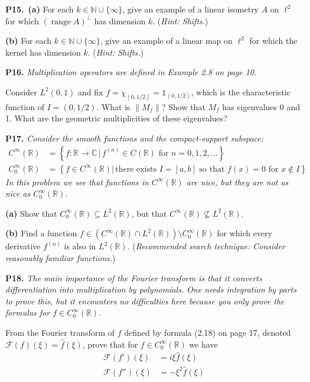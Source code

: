 \documentclass[12pt]{amsart}
\newcommand{\cF}{\mathcal{F}}
\newcommand{\CC}{\mathbb{C}}
\newcommand{\NN}{\mathbb{N}}
\newcommand{\RR}{\mathbb{R}}
\newcommand{\range}{\operatorname{range}}
\newcommand{\prob}[1]{\bigskip\noindent\textbf{#1.}\quad }
\newcommand{\epart}[1]{\medskip\noindent\textbf{(#1)}\quad }
\newcommand{\ppart}[1]{\,\textbf{(#1)}\quad }
\begin{document}
\prob{P15}  \ppart{a} For each $k\in \NN \cup\{\infty\}$, give an example of a linear isometry $A$ on $\ell^2$ for which $(\range{A})^\perp$ has dimension $k$.  (\emph{Hint: Shifts.})

\epart{b}  For each $k\in \NN \cup\{\infty\}$, give an example of a linear map on $\ell^2$ for which the kernel has dimension $k$.  (\emph{Hint: Shifts.})


\clearpage\newpage
\prob{P16}  \emph{Multiplication operators are defined in Example 2.8 on page 10.}

\medskip
\noindent
Consider $L^2(0,1)$ and fix $f=\chi_{(0,1/2)}=\mathds{1}_{(0,1/2)}$, which is the characteristic function of $I=(0,1/2)$.  What is $\|M_f\|$?  Show that $M_f$ has eigenvalues 0 and 1.  What are the geometric multiplicities of these eigenvalues?


\prob{P17}  \emph{Consider the smooth functions and the compact-support subspace:}
\begin{align*}
C^\infty(\RR) &= \left\{f:\RR\to\CC\,\big|\, f^{(n)} \in C(\RR) \text{ for } n=0,1,2,\dots\right\} \\
C_0^\infty(\RR) &= \left\{f\in C^\infty(\RR)\big|\, \text{there exists $I=[a,b]$ so that $f(x)=0$ for $x\notin I$}\right\}
\end{align*}
\emph{In this problem we see that functions in $C^\infty(\RR)$ are nice, but they are not as nice as $C_0^\infty(\RR)$.}

\epart{a} Show that $C_0^\infty(\RR) \subseteq L^2(\RR)$, but that $C^\infty(\RR) \nsubseteq L^2(\RR)$.

\epart{b} Find a function $f \in \left(C^\infty(\RR) \cap L^2(\RR)\right) \setminus C_0^\infty(\RR)$ for which every derivative $f^{(n)}$ is also in $L^2(\RR)$.  (\emph{Recommended search technique: Consider reasonably familiar functions.})

\prob{P18}  \emph{The main importance of the Fourier transform is that it converts differentiation into multiplication by polynomials.  One needs integration by parts to prove this, but it encounters no difficulties here because you only prove the formulas for $f\in C_0^\infty(\RR)$.}

\medskip\noindent
From the Fourier transform of $f$ defined by formula (2.18) on page 17, denoted $\cF(f)(\xi)=\hat f(\xi)$, prove that for $f\in C_0^\infty(\RR)$ we have
\begin{align*}
\cF(f')(\xi) &= i\xi \hat f(\xi) \\
\cF(f'')(\xi) &= -\xi^2 \hat f(\xi)
\end{align*}
\end{document}
